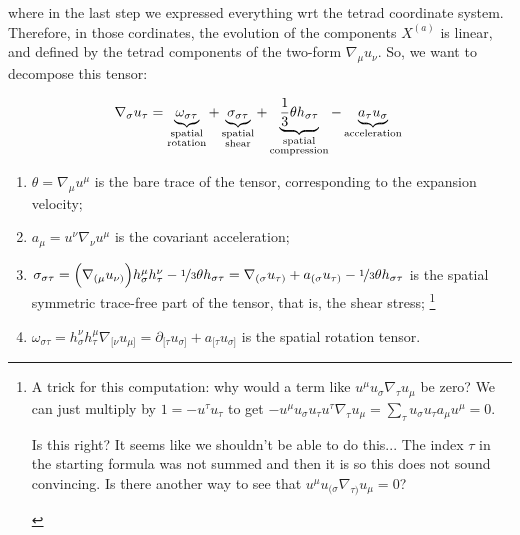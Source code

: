 \documentclass[main.tex]{subfiles}
\begin{document}
where in the last step we expressed everything wrt the tetrad coordinate system. Therefore, in those cordinates, the evolution of the components \(X^{(a)}\) is linear, and defined by the tetrad components of the two-form \(\nabla_\mu u_\nu\). So, we want to decompose this tensor:

\begin{equation} \label{eq:covariant-acceleration-decomposition}
    \nabla_\sigma u_\tau =
    \underbrace{\omega_{\sigma \tau}}_{\substack{\text{spatial} \\ \text{rotation}}}
    + \underbrace{\sigma_{\sigma\tau}}_{\substack{\text{spatial} \\ \text{shear}}}
    + \underbrace{\frac{1}{3} \theta h_{\sigma\tau}}_{\substack{\text{spatial} \\
    \text{compression}}}
    - \underbrace{ a_\tau u_\sigma}_{ \text{acceleration}} \\
\end{equation}

\begin{enumerate}
    \item \(\theta = \nabla_\mu u^\mu\) is the bare trace of the tensor, corresponding to the expansion velocity;
    \item \(a_\mu = u^\nu \nabla_\nu u^\mu\) is the covariant acceleration;
    \item \(\sigma_{\sigma \tau} = \qty(\nabla_{(\mu} u_{\nu)}) h^\mu_\sigma h^\nu _\tau - \frac[i]{1}{3} \theta h_{\sigma \tau} = \nabla_{(\sigma} u_{\tau)} + a_{(\sigma} u_{\tau)} - \frac[i]{1}{3} \theta h_{\sigma \tau} \) is the spatial symmetric trace-free part of the tensor, that is, the shear stress;
    \footnote{A trick for this computation: why would a term like \(u^\mu u_\sigma \nabla_\tau u_\mu\) be zero? We can just multiply by \(1 = - u^\tau u_\tau\) to get \(-u^\mu u_\sigma u_\tau u^\tau \nabla_\tau u_\mu = \sum_\tau u_\sigma u_\tau a_\mu u^\mu = 0\).
    \begin{greenbox}
        Is this right? It seems like we shouldn't be able to do this... The index \(\tau\) in the starting formula was not summed and then it is so this does not sound convincing. Is there another way to see that \(u^\mu u_{(\sigma} \nabla_{\tau)} u_\mu = 0\)?
    \end{greenbox}}
    \item \(\omega_{\sigma \tau} = h^\nu_\sigma h^\mu_\tau \nabla_{[\nu} u_{\mu]} = \partial_{[\tau} u_{\sigma]} + a_{[\tau} u_{\sigma]}\) is the spatial rotation tensor.
\end{enumerate}
\end{document}
